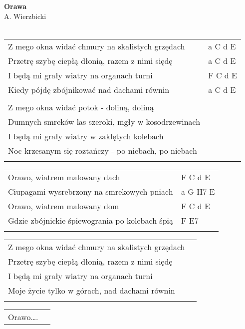 \documentclass[a5paper]{article}
\begin{document}


\noindent
\fontsize{12pt}{15pt}\selectfont
\textbf{Orawa} \\
\fontsize{8pt}{10pt}\selectfont
A. Wierzbicki \\ \\
\fontsize{10pt}{12pt}\selectfont
{}
\begin{tabular}{@{}p{9.00cm}p{3cm}@{}}
\noindent
Z mego okna widać chmury na skalistych grzędach & a C d E \\
Przetrę szybę ciepłą dłonią, razem z nimi siędę & a C d E \\
I będą mi grały wiatry na organach turni & F C d E \\
Kiedy pójdę zbójnikować nad dachami równin & a C d E \\ \\
 
Z mego okna widać potok - doliną, doliną \\
Dumnych smreków las szeroki, mgły w kosodrzewinach \\
I będą mi grały wiatry w zaklętych kolebach \\
Noc krzesanym się roztańczy - po niebach, po niebach \\ \\
\end{tabular}

\noindent
\begin{tabular}{@{}p{8.00cm}p{3cm}@{}} 
Orawo, wiatrem malowany dach & F C d E \\
Ciupagami wysrebrzony na smrekowych pniach & a G H7 E \\
Orawo, wiatrem malowany dom & F C d E \\
Gdzie zbójnickie śpiewogrania po kolebach śpią & F E7 \\ \\
\end{tabular}

\noindent
\begin{tabular}{@{}p{8.00cm}p{3cm}@{}}
Z mego okna widać chmury na skalistych grzędach \\
Przetrę szybę ciepłą dłonią, razem z nimi siędę \\
I będą mi grały wiatry na organach turni \\
Moje życie tylko w górach, nad dachami równin \\ \\
\end{tabular}

\noindent
\begin{tabular}{@{}p{8.00cm}p{3cm}@{}}
Orawo….
\end{tabular}
\end{document}
